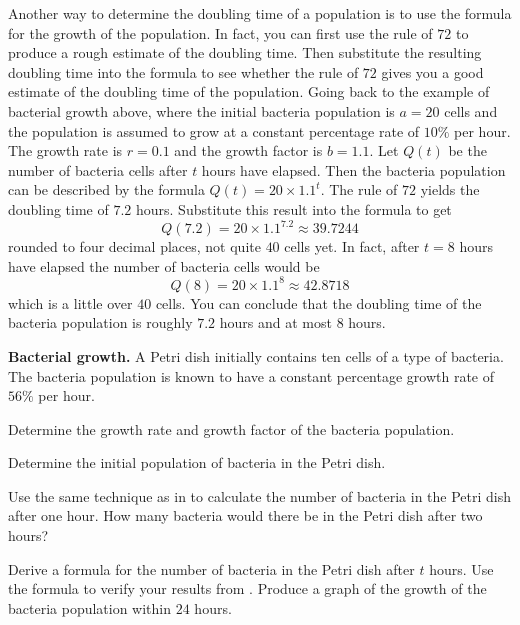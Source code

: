 \documentclass[a4paper,oneside,12pt]{article}
\begin{document}
Another way to determine the doubling time of a population is to use
the formula for the growth of the population.  In fact, you can first
use the rule of $72$ to produce a rough estimate of the doubling
time.  Then substitute the resulting doubling time into the formula to
see whether the rule of $72$ gives you a good estimate of the doubling
time of the population.  Going back to the example of bacterial growth
above, where the initial bacteria population is $a = 20$ cells and the
population is assumed to grow at a constant percentage rate of $10\%$
per hour.  The growth rate is $r = 0.1$ and the growth factor is
$b = 1.1$.  Let $Q(t)$ be the number of bacteria cells after $t$ hours
have elapsed.  Then the bacteria population can be described by the
formula $Q(t) = 20 \times 1.1^t$.  The rule of $72$ yields the
doubling time of $7.2$ hours.  Substitute this result into the formula
to get
\[
Q(7.2)
=
20 \times 1.1^{7.2}
\approx
39.7244
\]
rounded to four decimal places, not quite $40$ cells yet.  In fact,
after $t = 8$ hours have elapsed the number of bacteria cells would be
\[
Q(8)
=
20 \times 1.1^8
\approx
42.8718
\]
which is a little over $40$ cells.  You can conclude that the doubling
time of the bacteria population is roughly $7.2$ hours and at most $8$
hours.

\begin{example}
\label{eg:bacterial_growth}
\textbf{Bacterial growth.}
A Petri dish initially contains ten cells of a type of bacteria.  The
bacteria population is known to have a constant percentage growth rate
of $56\%$ per hour.
\begin{packedenum}
\item\label{subeg:bacteria_growth_rate}
  Determine the growth rate and growth factor of the bacteria
  population.

\item\label{subeg:bacteria_initial_population}
  Determine the initial population of bacteria in the Petri dish.

\item\label{subeg:bacteria_growth_1_2_hours}
  Use the same technique as in
   to calculate
  the number of bacteria in the Petri dish after one hour.  How many
  bacteria would there be in the Petri dish after two hours?

\item\label{subeg:bacteria_growth_formula}
  Derive a formula for the number of bacteria in the Petri dish after
  $t$ hours.  Use the formula to verify your results
  from .  Produce a graph of the
  growth of the bacteria population within $24$ hours.
\end{packedenum}
\end{example}
\end{document}
